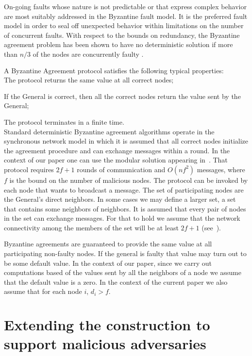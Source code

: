 \documentclass[10pt]{svjour3}
\begin{document}
On-going faults whose nature is not predictable or that
express complex behavior are most suitably addressed in the
Byzantine fault model. It is the preferred fault model in order to
seal off unexpected behavior within limitations on the number of
concurrent faults. With respect to the bounds on redundancy, the
Byzantine agreement problem has been shown to have no deterministic
solution if more than $n/3$ of the nodes are concurrently faulty
\cite{Agree82}.

A Byzantine Agreement protocol satisfies the following typical
properties:\\

 The protocol returns the same value at all
correct nodes;

 If the General is correct,  then  all the
correct nodes return the value sent by the General;

 The protocol terminates in a finite
time.\\

Standard deterministic Byzantine agreement algorithms operate in the
synchronous network model in which it is assumed that all correct
nodes initialize the agreement procedure and can exchange messages
within a round.  In the context of our paper one can use the modular
solution appearing in~\cite{FastAgree87}. That protocol requires
$2f+1$ rounds of communication and $O(nf^2)$ messages, where $f$ is
the bound on the number of malicious nodes. The protocol can be
invoked by each node that wants to broadcast a message. The set of
participating nodes are the General's direct neighbors. In some cases
we may define a larger set, a set that contains some neighbors of
neighbors.
It is assumed that every pair of nodes in the set can exchange messages.
For that to hold we assume that  the network connectivity among the members of the set will be at least $2f+1$ (see~\cite{d82}).

Byzantine agreements are guaranteed to provide the same value at all participating non-faulty nodes. If the general is faulty that value may turn out to be some default value.  In the context of our paper, since we carry out computations based of the values  sent by all the neighbors of a node we assume that the default value is a zero. In the context of the current paper we also assume that for each node $i$, $d_i>f.$



\section{Extending the construction to support malicious adversaries}
\label{malicious}
\end{document}

